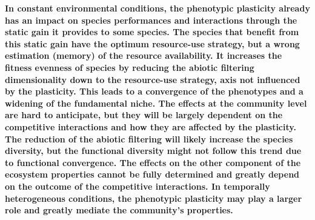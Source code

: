 \begin{figure}
    \classiccaptionstyle
{}\label{fig:rain_pl_effect}
\end{figure}

\textbf{In constant environmental conditions, the phenotypic plasticity already has an impact on species performances and interactions through the static gain it provides to some species. The species that benefit from this static gain have the optimum resource-use strategy, but a wrong estimation (memory) of the resource availability. It increases the fitness evenness of species by reducing the abiotic filtering dimensionality down to the resource-use strategy, axis not influenced by the plasticity. This leads to a convergence of the phenotypes and a widening of the fundamental niche. The effects at the community level are hard to anticipate, but they will be largely dependent on the competitive interactions and how they are affected by the plasticity. The reduction of the abiotic filtering will likely increase the species diversity, but the functional diversity might not follow this trend due to functional convergence. The effects on the other component of the ecosystem properties cannot be fully determined and greatly depend on the outcome of the competitive interactions. In temporally heterogeneous conditions, the phenotypic plasticity may play a larger role and greatly mediate the community's properties.}


